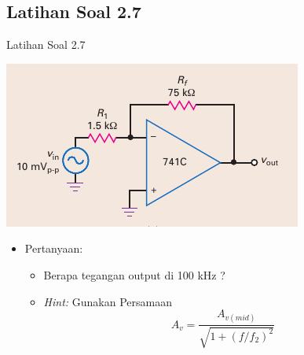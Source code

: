 \subsection{Latihan Soal 2.7}
\begin{frame}[t]{Latihan Soal 2.7}
	\begin{multicols}{2}
		\begin{center}
			\includegraphics[width=\linewidth]{gambar/fig-16.16a}
		\end{center}
		\columnbreak
		\begin{itemize}
			\item Pertanyaan:
			\begin{itemize}
				\item Berapa tegangan output di 100 kHz ?
				\item \textit{Hint:} Gunakan Persamaan \[ A_v = \frac{A_{v(mid)}}{ \sqrt{1 + (f/f_2)^2} } \]
			\end{itemize}
		\end{itemize}
	\end{multicols}
\end{frame}

